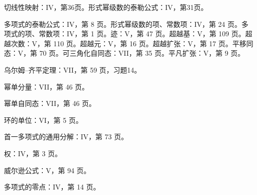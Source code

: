 切线性映射：IV，第36页。形式幂级数的泰勒公式：IV，第31页。

多项式的泰勒公式：IV，第 8 页。形式幂级数的项、常数项：IV，第 24 页。多项式的项、常数项：IV，第 1 页。迹：V，第 47 页。超越基：V，第 109 页。超越次数：V，第 110 页。超越元：V，第 16 页。超越扩张：V，第 17 页。平移同态：V，第 70 页。可三角化自同态：VII，第 35 页。平凡扩张：V，第 9 页。

乌尔姆–齐平定理：VII，第 59 页，习题14。

幂单分量：VII，第 46 页。

幂单自同态：VII，第 46 页。

环的单位：VI，第 5 页。

首一多项式的通用分解：IV，第 73 页。

权：IV，第 3 页。

威尔逊公式：V，第 94 页。

多项式的零点：IV，第 14 页。
\relax{}
